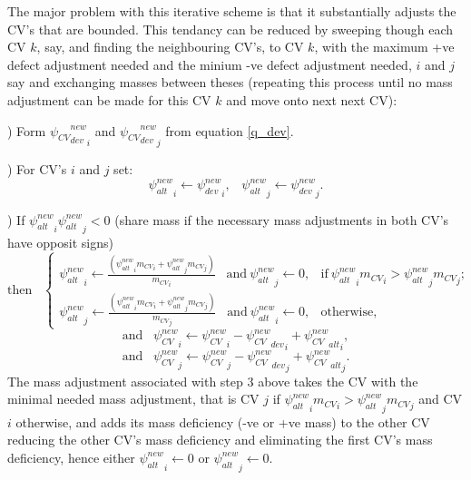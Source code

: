 The major problem with this iterative scheme is that it substantially adjusts the CV's 
that are bounded. This tendancy can be reduced by sweeping though each CV $k$, say, 
and finding the neighbouring CV's, to CV $k$, with the maximum +ve defect adjustment needed and 
the minium -ve defect adjustment needed, $i$ and $j$ say and exchanging masses between theses 
(repeating this process until no mass adjustment can be made for this CV $k$ and 
move onto next next CV):  

\par{}) Form ${{\psi_{CV}}^{new}_{dev}}_i$ and ${{\psi_{CV}}^{new}_{dev}}_j$ from equation 
\ref{q_dev}. 

\par{}) For CV's $i$ and $j$ set: 
\begin{equation}
{\psi^{new}_{alt}}_i \leftarrow {\psi^{new}_{dev}}_i, \;\;\;  {\psi^{new}_{alt}}_j \leftarrow {\psi^{new}_{dev}}_j .
\end{equation}

\par{}) If $
{\psi^{new}_{alt}}_i
{\psi^{new}_{alt}}_j  < 0 $ (share mass if the necessary mass adjustments in both CV's have opposit signs) 
\begin{equation}
\text{then} \;\;\; 
  \begin{cases}
 {\psi^{new}_{alt}}_i \leftarrow \frac{({\psi^{new}_{alt}}_i {m_{CV}}_i+ {\psi^{new}_{alt}}_j {m_{CV}}_j)}{{m_{CV}}_i} 
\;\;\;
\text{and} \ {\psi^{new}_{alt}}_j \leftarrow 0
, 
& \text{if} \
{{\psi^{new}_{alt}}_i {m_{CV}}_i> {\psi^{new}_{alt}}_j {m_{CV}}_j}
; \\
{\psi^{new}_{alt}}_j \leftarrow\frac{({\psi^{new}_{alt}}_i {m_{CV}}_i+ {\psi^{new}_{alt}}_j {m_{CV}}_j)}{{m_{CV}}_j}
\;\;\;
\text{and} \ {\psi^{new}_{alt}}_i \leftarrow 0,
     &  \text{otherwise}, 
  \end{cases}
\label{a_ij -alt}
\end{equation}
\begin{equation}
\text{and}\;\;\; 
{\psi_{CV}^{new}}_i \leftarrow {\psi_{CV}^{new}}_i - {{\psi_{CV}^{new}}_{dev}}_i + {{\psi_{CV}^{new}}_{alt}}_i, 
\end{equation}
\begin{equation}
\text{and}\;\;\;
{\psi_{CV}^{new}}_j \leftarrow {\psi_{CV}^{new}}_j - {{\psi_{CV}^{new}}_{dev}}_j + {{\psi_{CV}^{new}}_{alt}}_j. 
\end{equation}
The mass adjustment associated with step 3 above takes the CV with the minimal needed mass adjustment, 
that is CV $j$ if ${{\psi^{new}_{alt}}_i {m_{CV}}_i> {\psi^{new}_{alt}}_j {m_{CV}}_j}$ and CV $i$ otherwise, 
and adds its mass deficiency (-ve or +ve mass) to the other CV reducing the other CV's mass deficiency and 
eliminating the first CV's mass deficiency, hence 
either ${\psi^{new}_{alt}}_i \leftarrow 0$  or ${\psi^{new}_{alt}}_j \leftarrow 0$.

